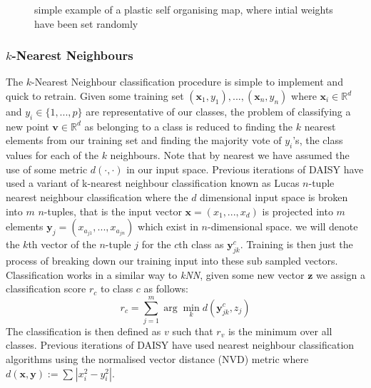 \documentclass[11pt, titlepage, oneside]{article}
\theoremstyle{plain}
\theoremstyle{definition}
\theoremstyle{remark}
\begin{document}
			\begin{figure}[H]
				\centering
				\caption{simple example of a plastic self organising map, where intial weights have been set randomly}
				\label{fig:psom}
			\end{figure}
			
		\subsubsection{$k$-Nearest Neighbours}
			The $k$-Nearest Neighbour classification procedure is simple to implement and quick to retrain. Given some training set $(\mathbf{x}_1,y_1),...,(\mathbf{x}_n,y_n)$ where $\mathbf{x}_i \in \mathbb{R}^{d}$ and $y_i \in \{1,...,p\}$ are representative of our classes, the problem of classifying a new point $\mathbf{v} \in \mathbb{R}^d$ as belonging to a class is reduced to finding the $k$ nearest elements from our training set and finding the majority vote of $y_i$'s, the class values for each of the $k$ neighbours. Note that by nearest we have assumed the use of some metric $d(\cdot,\cdot)$ in our input space. Previous iterations of DAISY have used a variant of k-nearest neighbour classification\cite{DAISY,book} known as Lucas $n$-tuple nearest neighbour classification\cite{lucas} where the $d$ dimensional input space is broken into $m$ $n$-tuples, that is the input vector $\mathbf{x}=(x_1,...,x_d)$ is projected into $m$ elements $\mathbf{y}_j = (x_{a_{j1}},...,x_{a_{jn}})$ which exist in $n$-dimensional space. we will denote the $k$th vector of the $n$-tuple $j$ for the $c$th class as $\mathbf{y}_{jk}^c$. Training is then just the process of breaking down our training input into these sub sampled vectors. Classification works in a similar way to \emph{kNN}, given some new vector $\mathbf{z}$ we assign a classification score $r_c$ to class $c$ as follows:
			\[
				r_c = \sum_{j=1}^{m}\arg\min_k d(\mathbf{y}_{jk}^c,z_j)
			\]
		The classification is then defined as $v$ such that $r_v$ is the minimum over all classes. Previous iterations of DAISY have used nearest neighbour classification algorithms using the normalised vector distance (NVD) metric\cite[p.~104]{book} where $d(\mathbf{x},\mathbf{y}):= \sum_{}|x_{i}^{2}-y_{i}^{2}|$.
\end{document}
